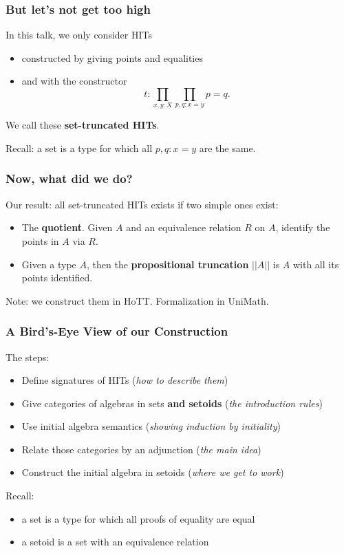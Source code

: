 \documentclass{beamer}
\begin{document}
\begin{frame}
\frametitle{But let's not get too high}
In this talk, we only consider HITs
\begin{itemize}
	\item constructed by giving points and equalities
	\item and with the constructor
	\[
	t : \prod_{x, y : X} \prod_{p, q : x = y} p = q.
	\]
\end{itemize}
We call these \textbf{set-truncated HITs}.

Recall: a set is a type for which all $p, q : x = y$ are the same.
\end{frame}

\begin{frame}
\frametitle{Now, what did we do?}
Our result: all set-truncated HITs exists if two simple ones exist:
\begin{itemize}
	\item The \textbf{quotient}. Given $A$ and an equivalence relation $R$ on $A$, identify the points in $A$ via $R$.
	\item Given a type $A$, then the \textbf{propositional truncation} $||A||$ is $A$ with all its points identified.
\end{itemize}
Note: we construct them in HoTT. Formalization in UniMath.
\end{frame}

\begin{frame}
\frametitle{A Bird's-Eye View of our Construction}
The steps:
\begin{itemize}
	\item Define signatures of HITs (\emph{how to describe them})
	\item Give categories of algebras in sets \textbf{and setoids} (\emph{the introduction rules})
	\item Use initial algebra semantics (\emph{showing induction by initiality})
	\item Relate those categories by an adjunction (\emph{the main idea})
	\item Construct the initial algebra in setoids (\emph{where we get to work})
\end{itemize}
Recall:
\begin{itemize}
	\item a set is a type for which all proofs of equality are equal
	\item a setoid is a set with an equivalence relation
\end{itemize}
\end{frame}
\end{document}
